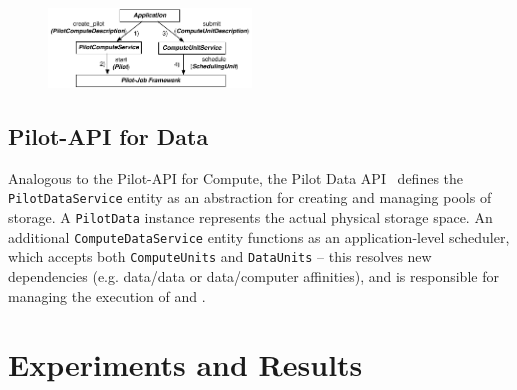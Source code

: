 \documentclass[conference]{IEEEtran}
\begin{document}
\begin{figure}[t]
	\centering
  \upp
		\includegraphics[width=0.48\textwidth]{../figures/pilot-api-flow.pdf}
	\caption{}
	\label{fig:figures_pilot_api_flow}
\end{figure}



\subsection{Pilot-API for Data}

Analogous to the Pilot-API for Compute, the Pilot Data
API~\cite{pilot_api} defines the \texttt{PilotDataService} entity as
an abstraction for creating and managing pools of storage. A
\texttt{PilotData} instance represents the actual physical storage
space. An additional \texttt{ComputeDataService} entity functions as an
application-level scheduler, which accepts both
\texttt{Compute\-Units} and \texttt{DataUnits} -- this resolves new
dependencies (e.g. data/data or data/computer affinities), and is
responsible for managing the execution of \dus and \cus.

\section{Experiments and Results}\label{sec:exp_res}
\end{document}
